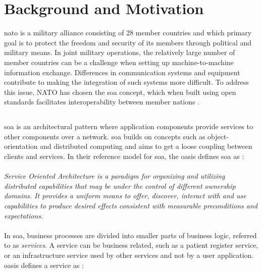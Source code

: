 \section{Background and Motivation}

\gls{nato} is a military alliance consisting of 28 member countries
\cite{nato-homepage-member-countries} and which primary goal is to protect the
freedom and security of its members through political and military means. In
joint military operations, the relatively large number of member countries can
be a challenge when setting up machine-to-machine information exchange.
Differences in communication systems and equipment contribute to making the
integration of such systems more difficult. To address this issue, NATO has
chosen the \gls{soa} concept, which when built using open standards facilitates
interoperability between member nations \cite{nnec-study}.

\subsection{}

\gls{soa} is an architectural pattern where application components provide
services to other components over a network. \gls{soa} builds on concepts such
as object-orientation and distributed computing and aims to get a loose coupling
between clients and services. In their reference model for \gls{soa}, the
\gls{oasis} defines \gls{soa} as \cite{oasis-soa-reference-model}:

\paragraph{}

\textit{Service Oriented Architecture is a paradigm for organizing and utilizing
distributed capabilities that may be under the control of different ownership
domains. It provides a uniform means to offer, discover, interact with and use
capabilities to produce desired effects consistent with measurable preconditions
and expectations.}

\paragraph{}

In \gls{soa}, business processes are divided into smaller parts of business
logic, referred to as \textit{services}. A service can be business related, such
as a patient register service, or an infrastructure service used by other
services and not by a user application. \gls{oasis} defines a service as
\cite{oasis-soa-reference-model}:

